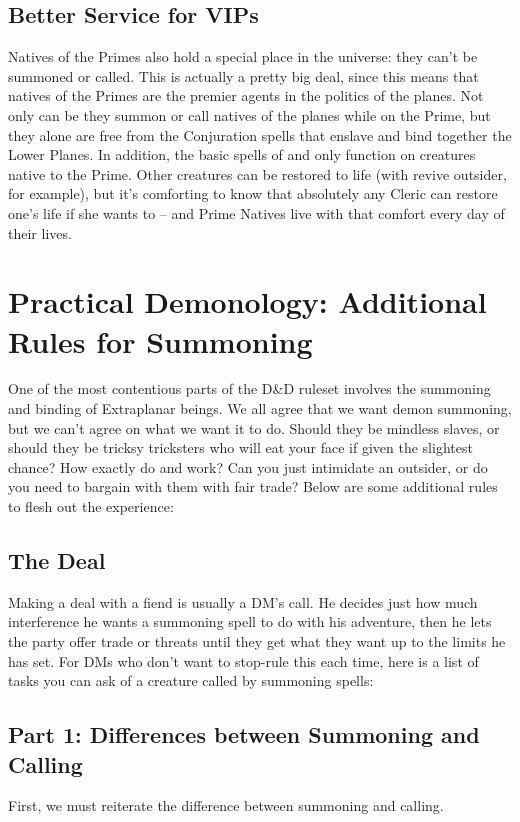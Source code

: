 \subsection{Better Service for VIPs}
Natives of the Primes also hold a special place in the universe: they can't be summoned or called. This is actually a pretty big deal, since this means that natives of the Primes are the premier agents in the politics of the planes. Not only can be they summon or call natives of the planes while on the Prime, but they alone are free from the Conjuration spells that enslave and bind together the Lower Planes. In addition, the basic spells of  and  only function on creatures native to the Prime. Other creatures can be restored to life (with revive outsider, for example), but it's comforting to know that absolutely any Cleric can restore one's life if she wants to -- and Prime Natives live with that comfort every day of their lives.

\section{Practical Demonology: Additional Rules for Summoning}
One of the most contentious parts of the D\&D ruleset involves the summoning and binding of Extraplanar beings. We all agree that we want demon summoning, but we can't agree on what we want it to do. Should they be mindless slaves, or should they be tricksy tricksters who will eat your face if given the slightest chance? How exactly do  and  work? Can you just intimidate an outsider, or do you need to bargain with them with fair trade? Below are some additional rules to flesh out the experience:

\subsection{The Deal}
Making a deal with a fiend is usually a DM's call. He decides just how much interference he wants a summoning spell to do with his adventure, then he lets the party offer trade or threats until they get what they want up to the limits he has set. For DMs who don't want to stop-rule this each time, here is a list of tasks you can ask of a creature called by summoning spells:

\subsection{Part 1: Differences between Summoning and Calling}
First, we must reiterate the difference between summoning and calling.

